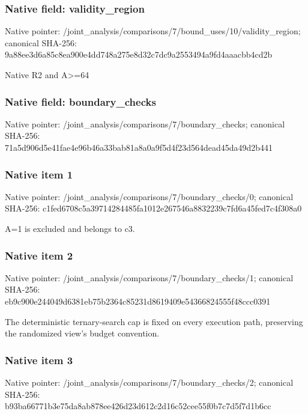 \documentclass[10pt,a4paper]{article}
\begin{document}
\subsubsection{Native field: validity\_\allowbreak{}region}
Native pointer: /joint\_\allowbreak{}analysis/comparisons/7/bound\_\allowbreak{}uses/10/validity\_\allowbreak{}region; canonical SHA-256: 9a88ee3d6a85c8ea900e4dd748a275e8d32c7dc9a2553494a9fd4aaacbb4cd2b

\begingroup\raggedright\sloppy Native R2 and A>=\allowbreak{}64\par\endgroup

\subsubsection{Native field: boundary\_\allowbreak{}checks}
Native pointer: /joint\_\allowbreak{}analysis/comparisons/7/boundary\_\allowbreak{}checks; canonical SHA-256: 71a5d906d5e41fae4e96b46a33bab81a8a0a9f5d4f23d564dead45da49d2b441

\subsubsection{Native item 1}
Native pointer: /joint\_\allowbreak{}analysis/comparisons/7/boundary\_\allowbreak{}checks/0; canonical SHA-256: c1fed6708c5a39714284485fa1012e267546a8832239c7fd6a45fed7c4f308a0

\begingroup\raggedright\sloppy A=\allowbreak{}1 is excluded and belongs to c3.\par\endgroup

\subsubsection{Native item 2}
Native pointer: /joint\_\allowbreak{}analysis/comparisons/7/boundary\_\allowbreak{}checks/1; canonical SHA-256: eb9c900e244049d6381eb75b2364c85231d8619409e54366824555f48ccc0391

\begingroup\raggedright\sloppy The deterministic ternary-search cap is fixed on every execution path,\allowbreak{} preserving the randomized view's budget convention.\par\endgroup

\subsubsection{Native item 3}
Native pointer: /joint\_\allowbreak{}analysis/comparisons/7/boundary\_\allowbreak{}checks/2; canonical SHA-256: b93ba66771b3e75da8ab878ee426d23d612c2d16c52cee55f0b7c7d5f7d1b6cc
\end{document}
